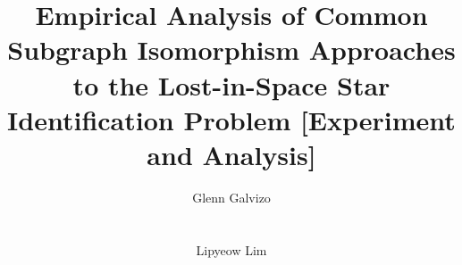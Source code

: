 \documentclass{include/vldb}
\begin{document}
	\title{Empirical Analysis of Common Subgraph Isomorphism Approaches to the Lost-in-Space Star
    Identification Problem [Experiment and Analysis]}

	\author{
		\alignauthor Glenn Galvizo  \\
			 \\
			 \\
		\alignauthor Lipyeow Lim \\
			 \\
			 \\
	}

	\maketitle

	
	
	
	
	
	
	
    
    \balance

	
	
\end{document}
